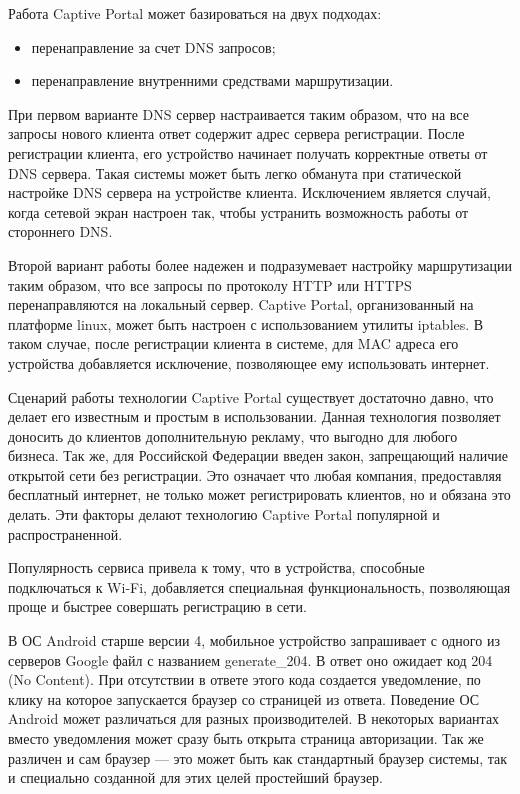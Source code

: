 Работа Captive Portal может базироваться на двух подходах:

\begin{itemize}
	\item перенаправление за счет DNS запросов;
	\item перенаправление внутренними средствами маршрутизации.
\end{itemize}

При первом варианте DNS сервер настраивается таким образом, что на все запросы нового клиента ответ содержит адрес сервера регистрации. После регистрации клиента, его устройство начинает получать корректные ответы от DNS сервера. Такая системы может быть легко обманута при статической настройке DNS сервера на устройстве клиента. Исключением является случай, когда сетевой экран настроен так, чтобы устранить возможность работы от стороннего DNS.

Второй вариант работы более надежен и подразумевает настройку маршрутизации таким образом, что все запросы по протоколу HTTP или HTTPS перенаправляются на локальный сервер. Captive Portal, организованный на платформе linux, может быть настроен с использованием утилиты iptables. В таком случае, после регистрации клиента в системе, для MAC адреса его устройства добавляется исключение, позволяющее ему использовать интернет.

Сценарий работы технологии Captive Portal существует достаточно давно, что делает его известным и простым в использовании. Данная технология позволяет доносить до клиентов дополнительную рекламу, что выгодно для любого бизнеса. Так же, для Российской Федерации введен закон, запрещающий наличие открытой сети без регистрации. Это означает что любая компания, предоставляя бесплатный интернет, не только может регистрировать клиентов, но и обязана это делать. Эти факторы делают технологию Captive Portal популярной и распространенной. 

Популярность сервиса привела к тому, что в устройства, способные подключаться к Wi-Fi, добавляется специальная функциональность, позволяющая проще и быстрее совершать регистрацию в сети. 

В ОС Android старше версии 4, мобильное устройство запрашивает с одного из серверов Google файл с названием generate\_204. В ответ оно ожидает код 204 (No Content). При отсутствии в ответе этого кода создается уведомление, по клику на которое запускается браузер со страницей из ответа. Поведение ОС Android может различаться для разных производителей. В некоторых вариантах вместо уведомления может сразу быть открыта страница авторизации. Так же различен и сам браузер --- это может быть как стандартный браузер системы, так и специально созданной для этих целей простейший браузер.

